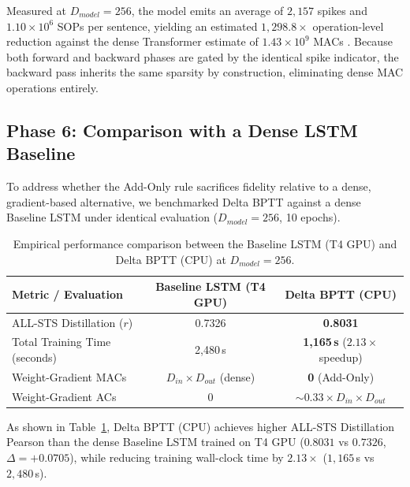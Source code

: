 \documentclass[11pt, conference, compsoc, twoside]{IEEEtran}
\begin{document}
Measured at $D_{model}=256$, the model emits an average of $2{,}157$ spikes and $1.10 \times 10^6$ SOPs per sentence, yielding an estimated $1{,}298.8\times$ operation-level reduction against the dense Transformer estimate of $1.43 \times 10^9$ MACs \cite{horowitz2014computing}. Because both forward and backward phases are gated by the identical spike indicator, the backward pass inherits the same sparsity by construction, eliminating dense MAC operations entirely.

\subsection{Phase 6: Comparison with a Dense LSTM Baseline}
To address whether the Add-Only rule sacrifices fidelity relative to a dense, gradient-based alternative, we benchmarked Delta BPTT against a dense Baseline LSTM under identical evaluation ($D_{model}=256$, 10 epochs).

\begin{table}[t]
\begin{center}
{\caption{Empirical performance comparison between the Baseline LSTM (T4 GPU) and Delta BPTT (CPU) at $D_{model}=256$.}\label{tab:bptt_comparison}}


\begin{tabular}{lcc}
\toprule
\textbf{Metric / Evaluation} & \textbf{Baseline LSTM (T4 GPU)} & \textbf{Delta BPTT (CPU)} \\
\midrule
ALL-STS Distillation ($r$) & 0.7326 & \textbf{0.8031} \\
Total Training Time (seconds) & 2,480\,s & \textbf{1,165\,s} ($2.13\times$ speedup) \\
Weight-Gradient MACs & $D_{in} \times D_{out}$ (dense) & \textbf{0} (Add-Only) \\
Weight-Gradient ACs & $0$ & $\sim 0.33 \times D_{in} \times D_{out}$ \\

\bottomrule
\end{tabular}
\end{center}
\end{table}

As shown in Table~\ref{tab:bptt_comparison}, Delta BPTT (CPU) achieves higher ALL-STS Distillation Pearson than the dense Baseline LSTM trained on T4 GPU ($0.8031$ vs $0.7326$, $\Delta = +0.0705$), while reducing training wall-clock time by $2.13\times$ ($1{,}165$\,s vs $2{,}480$\,s).
\end{document}

